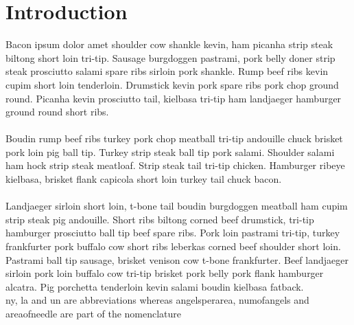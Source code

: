 \chapter{Introduction}
    Bacon ipsum dolor amet shoulder cow shankle kevin, ham picanha strip steak biltong short loin tri-tip. Sausage burgdoggen pastrami, pork belly doner strip steak prosciutto salami spare ribs sirloin pork shankle. Rump beef ribs kevin cupim short loin tenderloin. Drumstick kevin pork spare ribs pork chop ground round. Picanha kevin prosciutto tail, kielbasa tri-tip ham landjaeger hamburger ground round short ribs. \\ \\
    Boudin rump beef ribs turkey pork chop meatball tri-tip andouille chuck brisket pork loin pig ball tip. Turkey strip steak ball tip pork salami. Shoulder salami ham hock strip steak meatloaf. Strip steak tail tri-tip chicken. Hamburger ribeye kielbasa, brisket flank capicola short loin turkey tail chuck bacon. \\ \\
    Landjaeger sirloin short loin, t-bone tail boudin burgdoggen meatball ham cupim strip steak pig andouille. Short ribs biltong corned beef drumstick, tri-tip hamburger prosciutto ball tip beef spare ribs. Pork loin pastrami tri-tip, turkey frankfurter pork buffalo cow short ribs leberkas corned beef shoulder short loin. Pastrami ball tip sausage, brisket venison cow t-bone frankfurter. Beef landjaeger sirloin pork loin buffalo cow tri-tip brisket pork belly pork flank hamburger alcatra. Pig porchetta tenderloin kevin salami boudin kielbasa fatback.\\
    
    \gls{ny}, \gls{la} and \gls{un} are abbreviations whereas
\gls{angelsperarea}, \gls{numofangels} and \gls{areaofneedle} are part of the
nomenclature